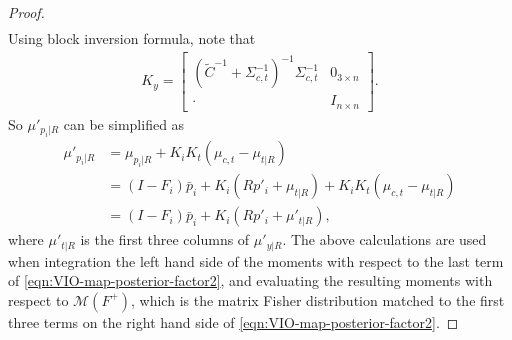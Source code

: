 \begin{proof}
\begin{align*}
	\end{align*}
	Using block inversion formula, note that
	\begin{align*}
		K_y = \begin{bmatrix} \left( \tilde{C}^{-1} + \Sigma_{c,t}^{-1} \right)^{-1} \Sigma_{c,t}^{-1} & 0_{3\times n} \\ \cdot & I_{n\times n} \end{bmatrix}.
	\end{align*}
	So $\mu'_{p_i|R}$ can be simplified as
	\begin{align*}
		\mu'_{p_i|R} &= \mu_{p_i|R} + K_iK_t(\mu_{c,t}-\mu_{t|R}) \\
		&= (I-F_i)\bar{p}_i + K_i(Rp'_i+\mu_{t|R}) + K_iK_t(\mu_{c,t} - \mu_{t|R}) \\
		&= (I-F_i)\bar{p}_i + K_i(Rp'_i+\mu'_{t|R}),
	\end{align*}
	where $\mu'_{t|R}$ is the first three columns of $\mu'_{y|R}$.
	The above calculations are used when integration the left hand side of the moments with respect to the last term of \eqref{eqn:VIO-map-posterior-factor2}, and evaluating the resulting moments with respect to $\mathcal{M}(F^+)$, which is the matrix Fisher distribution matched to the first three terms on the right hand side of \eqref{eqn:VIO-map-posterior-factor2}.
\end{proof}
